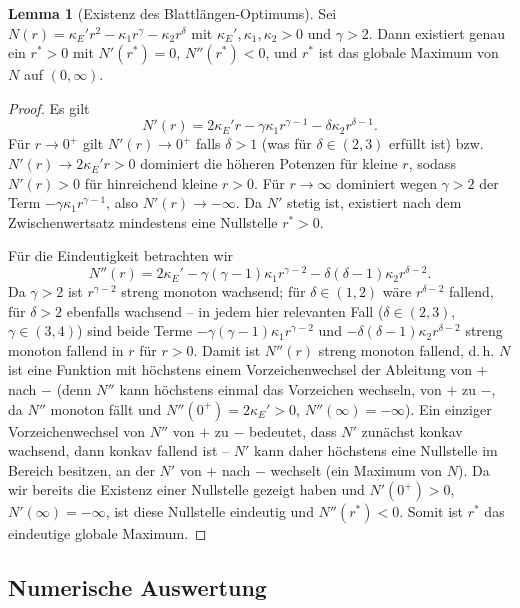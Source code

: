 ﻿\documentclass[a4paper,12pt]{article}
\theoremstyle{definition}
\newtheorem{lemma}{Lemma}
\begin{document}
\begin{lemma}[Existenz des Blattlängen-Optimums]
\label{lem:blatt_existenz}
Sei $N(r) = \kappa_E' r^2 - \kappa_1 r^{\gamma} - \kappa_2 r^{\delta}$ mit $\kappa_E', \kappa_1, \kappa_2>0$ und $\gamma>2$. Dann existiert genau ein $r^*>0$ mit $N'(r^*)=0$, $N''(r^*)<0$, und $r^*$ ist das globale Maximum von $N$ auf $(0,\infty)$.
\end{lemma}

\begin{proof}
Es gilt
\[
N'(r) = 2\kappa_E' r - \gamma\kappa_1 r^{\gamma-1} - \delta\kappa_2 r^{\delta-1}.
\]
Für $r\to0^+$ gilt $N'(r)\to 0^+$ falls $\delta>1$ (was für $\delta\in(2,3)$ erfüllt ist) bzw. $N'(r)\to 2\kappa_E' r >0$ dominiert die höheren Potenzen für kleine $r$, sodass $N'(r)>0$ für hinreichend kleine $r>0$. Für $r\to\infty$ dominiert wegen $\gamma>2$ der Term $-\gamma\kappa_1 r^{\gamma-1}$, also $N'(r)\to-\infty$. Da $N'$ stetig ist, existiert nach dem Zwischenwertsatz mindestens eine Nullstelle $r^*>0$.

Für die Eindeutigkeit betrachten wir
\[
N''(r) = 2\kappa_E' - \gamma(\gamma-1)\kappa_1 r^{\gamma-2} - \delta(\delta-1)\kappa_2 r^{\delta-2}.
\]
Da $\gamma>2$ ist $r^{\gamma-2}$ streng monoton wachsend; für $\delta\in(1,2)$ wäre $r^{\delta-2}$ fallend, für $\delta>2$ ebenfalls wachsend -- in jedem hier relevanten Fall ($\delta\in(2,3)$, $\gamma\in(3,4)$) sind beide Terme $-\gamma(\gamma-1)\kappa_1 r^{\gamma-2}$ und $-\delta(\delta-1)\kappa_2 r^{\delta-2}$ streng monoton fallend in $r$ für $r>0$. Damit ist $N''(r)$ streng monoton fallend, d.\,h. $N$ ist eine Funktion mit höchstens einem Vorzeichenwechsel der Ableitung von $+$ nach $-$ (denn $N''$ kann höchstens einmal das Vorzeichen wechseln, von $+$ zu $-$, da $N''$ monoton fällt und $N''(0^+)=2\kappa_E'>0$, $N''(\infty)=-\infty$). Ein einziger Vorzeichenwechsel von $N''$ von $+$ zu $-$ bedeutet, dass $N'$ zunächst konkav wachsend, dann konkav fallend ist -- $N'$ kann daher höchstens eine Nullstelle im Bereich besitzen, an der $N'$ von $+$ nach $-$ wechselt (ein Maximum von $N$). Da wir bereits die Existenz einer Nullstelle gezeigt haben und $N'(0^+)>0$, $N'(\infty)=-\infty$, ist diese Nullstelle eindeutig und $N''(r^*)<0$. Somit ist $r^*$ das eindeutige globale Maximum. \qedhere
\end{proof}

\subsection{Numerische Auswertung}
\end{document}
